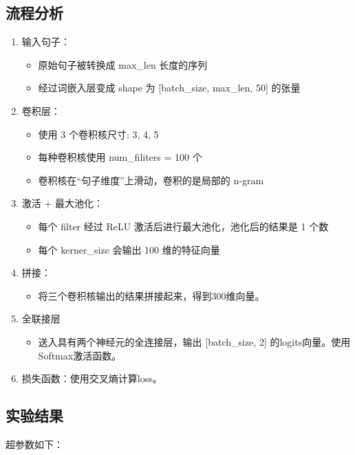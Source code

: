 \documentclass{article}
\begin{document}
\FloatBarrier

\subsection{流程分析}

\begin{enumerate}
    \item 输入句子：
        \begin{itemize}
            \item 原始句子被转换成 max\_len 长度的序列
            \item 经过词嵌入层变成 shape 为 [batch\_size, max\_len, 50] 的张量
        \end{itemize}
    \item 卷积层：
        \begin{itemize}
            \item 使用 3 个卷积核尺寸: 3, 4, 5
            \item 每种卷积核使用 num\_filiters = 100 个
            \item 卷积核在“句子维度”上滑动，卷积的是局部的 n-gram
        \end{itemize}
    \item 激活 + 最大池化：
        \begin{itemize}
            \item 每个 filter 经过 ReLU 激活后进行最大池化，池化后的结果是 1 个数
            \item 每个 kerner\_size 会输出 100 维的特征向量
        \end{itemize}
    \item 拼接：
        \begin{itemize}
            \item 将三个卷积核输出的结果拼接起来，得到300维向量。
        \end{itemize}
    \item 全联接层 
        \begin{itemize}
            \item 送入具有两个神经元的全连接层，输出 [batch\_size, 2] 的logits向量。使用Softmax激活函数。
        \end{itemize}
    \item 损失函数：使用交叉熵计算loss。
\end{enumerate}

\subsection{实验结果}
超参数如下：
\end{document}
